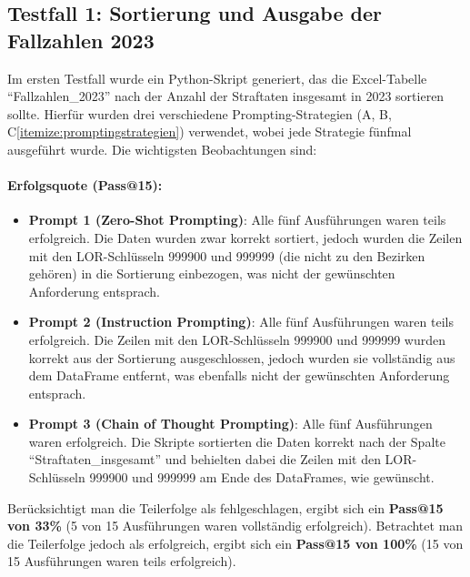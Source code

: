 \documentclass[11pt,a4paper]{article}
\begin{document}
\subsection{Testfall 1: Sortierung und Ausgabe der Fallzahlen 2023}
\label{subsec:auswertung_testfall1 }
    
Im ersten Testfall wurde ein Python-Skript generiert, das die Excel-Tabelle \enquote{Fallzahlen\_2023} nach der Anzahl der Straftaten insgesamt in 2023 sortieren sollte. Hierfür wurden drei verschiedene Prompting-Strategien (A, B, C\ref{itemize:promptingstrategien}) verwendet, wobei jede Strategie fünfmal ausgeführt wurde. Die wichtigsten Beobachtungen sind:
    
\paragraph{Erfolgsquote (Pass@15):}
\begin{itemize}
    \item \textbf{Prompt 1 (Zero-Shot Prompting)}: Alle fünf Ausführungen waren teils erfolgreich. Die Daten wurden zwar korrekt sortiert, jedoch wurden die Zeilen mit den LOR-Schlüsseln 999900 und 999999 (die nicht zu den Bezirken gehören) in die Sortierung einbezogen, was nicht der gewünschten Anforderung entsprach.
    \item \textbf{Prompt 2 (Instruction Prompting)}: Alle fünf Ausführungen waren teils erfolgreich. Die Zeilen mit den LOR-Schlüsseln 999900 und 999999 wurden korrekt aus der Sortierung ausgeschlossen, jedoch wurden sie vollständig aus dem DataFrame entfernt, was ebenfalls nicht der gewünschten Anforderung entsprach.
    \item \textbf{Prompt 3 (Chain of Thought Prompting)}: Alle fünf Ausführungen waren erfolgreich. Die Skripte sortierten die Daten korrekt nach der Spalte \enquote{Straftaten\_insgesamt} und behielten dabei die Zeilen mit den LOR-Schlüsseln 999900 und 999999 am Ende des DataFrames, wie gewünscht.
\end{itemize}
Berücksichtigt man die Teilerfolge als fehlgeschlagen, ergibt sich ein \textbf{Pass@15 von 33\%} (5 von 15 Ausführungen waren vollständig erfolgreich). Betrachtet man die Teilerfolge jedoch als erfolgreich, ergibt sich ein \textbf{Pass@15 von 100\%} (15 von 15 Ausführungen waren teils erfolgreich).
    
\end{document}
